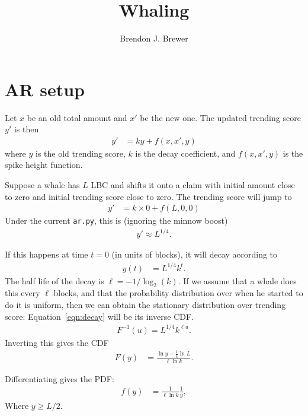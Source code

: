 \documentclass[a4paper, 12pt]{article}
\title{Whaling}
\author{Brendon J. Brewer}
\date{}
\begin{document}
\maketitle


\setlength{\parindent}{0pt}
\setlength{\parskip}{8pt}

\section{AR setup}
Let $x$ be an old total amount and $x'$ be the new one. The updated trending
score $y'$ is then
\begin{align}
y' &= ky + f(x, x', y)
\end{align}
where $y$ is the old trending score, $k$ is the decay coefficient, and
$f(x, x', y)$ is the spike height function.

Suppose a whale has $L$ LBC and shifts it onto a claim with initial amount
close to zero and initial trending score close to zero.
The trending score will jump to
\begin{align}
y' &= k \times 0 + f(L, 0, 0)
\end{align}
Under the current {\tt ar.py}, this is (ignoring the minnow boost)
\begin{align}
y' \approx L^{1/4}.
\end{align}

If this happens at time $t=0$ (in units of blocks), it will decay according to
\begin{align}
y(t) &= L^{1/4} k^t. \label{eqn:decay}
\end{align}
The half life of the decay is $\ell = -1/\log_2(k)$. If we assume that a whale
does this every $\ell$ blocks, and that the probability distribution
over when he started to do it is uniform, then we can obtain the
stationary distribution over trending score:
Equation~\ref{eqn:decay} will be its inverse CDF.
\begin{align}
F^{-1}(u) = L^{1/4} k^{\ell u}.
\end{align}
Inverting this gives the CDF
\begin{align}
F(y) &= \frac{\ln y - \frac{1}{4}\ln L}{\ell \ln k}.
\end{align}

Differentiating gives the PDF:
\begin{align}
f(y) &= \frac{1}{\ell \ln k} \frac{1}{y},
\end{align}
Where $y \geq L/2$.






\end{document}
